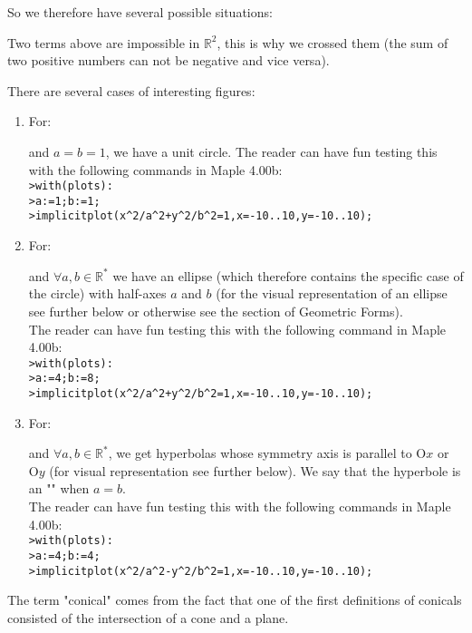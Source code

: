 \begin{enumerate}
\begin{itemize}
			So we therefore have several possible situations:
			
			Two terms above are impossible in $\mathbb{R}^2$, this is why we crossed them (the sum of two positive numbers can not be negative and vice versa).
			
			There are several cases of interesting figures:			
			\begin{enumerate}
				\item For\label{equation of a circle}:
					
				and $a=b=1$, we have a unit circle. The reader can have fun testing this with the following commands in Maple 4.00b:\\
				
				\texttt{>with(plots):}\\
				\texttt{>a:=1;b:=1;}\\
				\texttt{>implicitplot(x\string^2/a\string^2+y\string^2/b\string^2=1,x=-10..10,y=-10..10);}
				
				\item For:
					
				and $\forall a,b \in \mathbb{R}^{*}$ we have an ellipse\label{analytical expression ellipse} (which therefore contains the specific case of the circle) with half-axes $a$ and $b$ (for the visual representation of an ellipse see further below or otherwise see the section of Geometric Forms).\\
				
				The reader can have fun testing this with the following command in Maple 4.00b:\\
				
				\texttt{>with(plots):}\\
				\texttt{>a:=4;b:=8;}\\
				\texttt{>implicitplot(x\string^2/a\string^2+y\string^2/b\string^2=1,x=-10..10,y=-10..10);}
				
				\item For:
				
				and $\forall a,b \in \mathbb{R}^{*}$, we get hyperbolas whose symmetry axis is parallel to $\text{O}x$ or $\text{O}y$ (for visual representation see further below). We say that the hyperbole is an "\label{hyperbola}" when $a = b$.\\
				
				The reader can have fun testing this with the following commands in Maple 4.00b:\\
				
				\texttt{>with(plots):}\\
				\texttt{>a:=4;b:=4;}\\
				\texttt{>implicitplot(x\string^2/a\string^2-y\string^2/b\string^2=1,x=-10..10,y=-10..10);}	
			\end{enumerate}
		\end{itemize}
		The term "conical" comes from the fact that one of the first definitions of conicals consisted of the intersection of a cone and a plane.
		

\end{enumerate}
